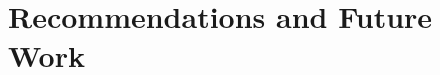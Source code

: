 \documentclass{erauthesis}
\begin{document}


\chapter{Recommendations and Future Work} \label{chap:recommendations} \label{futurework}
% 

\end{document}
